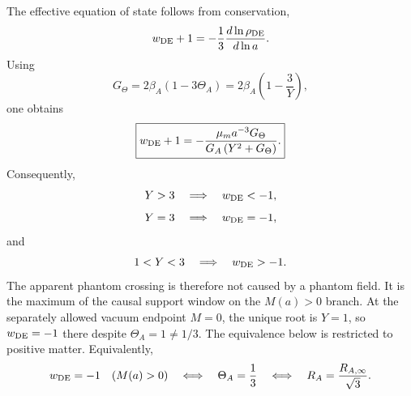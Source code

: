 \documentclass[12pt,a4paper]{article}
\begin{document}
The effective equation of state follows from conservation,
\begin{equation}
\label{p8:eq:hs-w-conservation}
    w_{\rm DE}+1
    =
    -\frac13\frac{d\ln\rho_{\rm DE}}{d\ln a}.
\end{equation}
Using
\begin{equation}
\label{p8:eq:hs-Gtheta}
    G_\Theta
    =
    2\beta_A(1-3\Theta_A)
    =
    2\beta_A\left(1-\frac3Y\right),
\end{equation}
one obtains
\begin{equation}
\label{p8:eq:hs-wDE-result}
    \boxed{
    w_{\rm DE}+1
    =
    -
    \frac{
    \mu_m a^{-3}G_\Theta
    }{
    G_A\left(Y^2+G_\Theta\right)
    }.
    }
\end{equation}
Consequently,
\begin{equation}
    Y>3 \quad\Longrightarrow\quad w_{\rm DE}<-1,
\end{equation}
\begin{equation}
    Y=3 \quad\Longrightarrow\quad w_{\rm DE}=-1,
\end{equation}
and
\begin{equation}
    1<Y<3 \quad\Longrightarrow\quad w_{\rm DE}>-1.
\end{equation}
The apparent phantom crossing is therefore not caused by a phantom field.  It
is the maximum of the causal support window on the \(M(a)>0\) branch.
At the separately allowed vacuum endpoint \(M=0\), the unique root
is \(Y=1\), so \(w_{\rm DE}=-1\) there despite
\(\Theta_A=1\ne1/3\). The equivalence below is restricted to positive
matter. Equivalently,
\begin{equation}
\label{p8:eq:hs-crossing-geometric}
    w_{\rm DE}=-1\quad(M(a)>0)
    \quad\Longleftrightarrow\quad
    \Theta_A=\frac13
    \quad\Longleftrightarrow\quad
    R_A=\frac{R_{A,\infty}}{\sqrt3}.
\end{equation}
\end{document}
